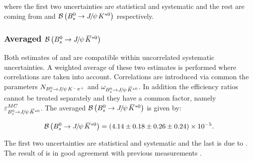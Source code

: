  \noindent where the first two uncertainties are statistical and systematic and the rest are coming from \fdfs and $\BRof\BdJpsiKst$ respectively.

\subsubsection{Averaged $\BRof\BsJpsiKst$}
Both estimates of  and  are compatible within uncorrelated systematic uncertainties.
A weighted average of these two estimates is performed where correlations are taken into account.
Correlations are introduced via common the parameters $N_{\BsJpsiKpi}$ and $\omega_{\BsJpsiKst}$.
In addition the efficiency ratios cannot be treated separately and they have a common factor,
namely $\varepsilon_{\BsJpsiKst}^{MC}$. The averaged $\BRof\BsJpsiKst$ is given by:

\begin{equation}
  \centering
\BRof\BsJpsiKst = (4.14 \pm 0.18 \pm 0.26 \pm 0.24 )\times 10^{-5}.
\label{Br_total}
\end{equation}

\noindent The first two uncertainties are statistical and systematic and the last is due to \fdfs.
The result of  is in good agreement with previous measurements \cite{Aaij:2012nh}.
